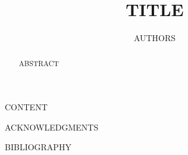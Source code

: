 \documentclass[runningheads]{llncs}
\begin{document}
\title{{{TITLE}}}

\author{{{AUTHORS}}}


\maketitle

\begin{abstract}
{{ABSTRACT}}

\end{abstract}

{{CONTENT}}

{{ACKNOWLEDGMENTS}}

{{BIBLIOGRAPHY}}
\end{document}
